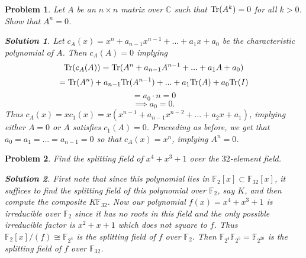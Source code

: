 \documentclass[11pt]{article}
\newcommand{\C}{\mathbb{C}}
\newcommand{\1}{\textbf{1}}
\newtheorem{prob}{Problem}
\newtheorem*{sol*}{\textit{Solution}}
\begin{document}
\begin{prob}
Let $A$ be an $n\times n $ matrix over $\C$ such that $\textnormal{Tr}(A^k) = 0$ for all $k>0$. Show that $A^n = 0$. 

\begin{sol*}
\textnormal{Let $c_A(x) = x^n + a_{n-1}x^{n-1} + ... + a_1 x + a_0$ be the characteristic polynomial of $A$. Then $c_A(A) = 0$ implying \[\textnormal{Tr}(c_A(A)) = \textnormal{Tr}(A^n + a_{n-1}A^{n-1} + ... + a_1 A + a_0)\] \[= \textnormal{Tr}(A^n) + a_{n-1}\textnormal{Tr}(A^{n-1}) + ... + a_1\textnormal{Tr}(A) + a_0\textnormal{Tr}(I)\] \[= a_0\cdot n = 0 \]\[\implies a_0 = 0.\] Thus $c_A(x) = xc_1(x) = x(x^{n-1} + a_{n-1}x^{n-2} + ... + a_2 x + a_1)$, implying either $A = 0$ or $A$ satisfies $c_1(A) = 0$. Proceeding as before, we get that $a_0 = a_1 = ... = a_{n-1} = 0$ so that $c_A(x) = x^n$, implying $A^n = 0$.  
}
\end{sol*}
\end{prob}


\begin{prob}
Find the splitting field of $x^4 + x^3 + 1$ over the $32$-element field. 

\begin{sol*}
\textnormal{ First note that since this polynomial lies in $\mathbb{F}_2[x]\subset\mathbb{F}_{32}[x]$, it suffices to find the splitting field of this polynomial over $\mathbb{F}_2$, say $K$, and then compute the composite $K\mathbb{F}_{32}$. Now our polynomial $f(x) = x^4 + x^3 +1$ is irreducible over $\mathbb{F}_2$ since it has no roots in this field and the only possible irreducible factor is $x^2 + x + 1$ which does not square to $f$. Thus $\mathbb{F}_2[x]/(f)\cong\mathbb{F}_{2^4}$ is the splitting field of $f$ over $\mathbb{F}_2$. Then $\mathbb{F}_{2^4}\mathbb{F}_{2^5} = \mathbb{F}_{2^{20}}$ is the splitting field of $f$ over $\mathbb{F}_{32}$. 
}
\end{sol*}
\end{prob}
\end{document}
